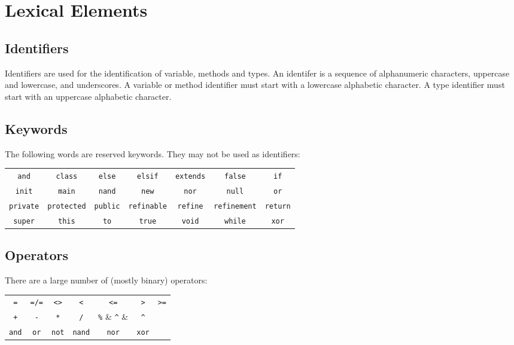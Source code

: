 \section{Lexical Elements}
\subsection{Identifiers}
Identifiers are used for the identification of variable,  methods and types. An identifer is a sequence of alphanumeric characters, uppercase and lowercase, and underscores. A variable or method identifier must start with a lowercase alphabetic character. A type identifier must start with an uppercase alphabetic character.

\subsection{Keywords}
The following words are reserved keywords. They may not be used as identifiers:
\begin{center}
\begin{tabular}{ccccccc}
\verb!and! & \verb!class! & \verb!else! & \verb!elsif! & \verb!extends! & \verb!false! & \verb!if!\\
\verb!init! & \verb!main! & \verb!nand! & \verb!new! & \verb!nor! & \verb!null! & \verb!or!\\
\verb!private! & \verb!protected! & \verb!public! & \verb!refinable! & \verb!refine! & \verb!refinement! & \verb!return!\\
\verb!super! & \verb!this! & \verb!to! & \verb!true! & \verb!void! & \verb!while! & \verb!xor!\\
\end{tabular}
\end{center}

\subsection{Operators}
There are a large number of (mostly binary) operators:
\begin{center}
\begin{tabular}{ccccccc}
\verb!=! & \verb!=/=! & \verb|<>| & \verb!<! & \verb!<=! & \verb!>! & \verb!>=!\\
\verb!+! & \verb!-! & \verb!*! & \verb!/! & \verb!%! & \verb!^! & \\
\verb!and! & \verb!or! & \verb!not! & \verb!nand! & \verb!nor! & \verb!xor!& \\
\end{tabular}
\end{center}

